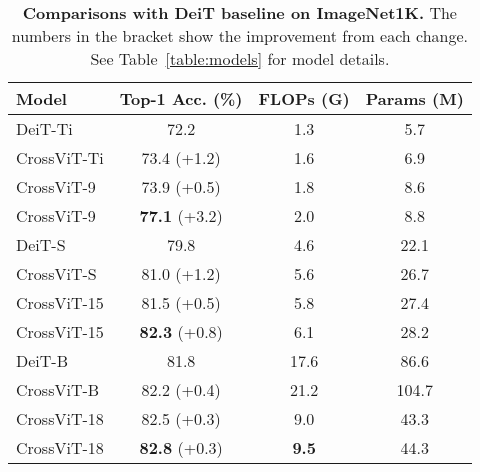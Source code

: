 \documentclass[10pt,twocolumn,letterpaper]{article}
\def\ours{CrossViT\xspace}
\begin{document}
%
 \begin{table}[t]
    \centering
    \begin{adjustbox}{max width=\linewidth}
    \begin{tabular}{l|c|c|c}
        \toprule
             Model   & Top-1 Acc. (\%) & FLOPs (G) & Params (M)  \\ 
        \midrule
             DeiT-Ti  & 72.2 & 1.3 & 5.7 \\
            \ours-Ti & 73.4 (+1.2) & 1.6 & 6.9 \\ 
\ours-9 & 73.9 (+0.5) & 1.8 & 8.6 \\
             \ours-9 & \textbf{77.1} (+3.2) & 2.0 & 8.8 \\






\midrule
            DeiT-S  &  79.8 & 4.6 & 22.1 \\
            \ours-S &  81.0 (+1.2) & 5.6 & 26.7 \\
            \ours-15&  81.5 (+0.5) & 5.8& 27.4 \\
            \ours-15 & \textbf{82.3} (+0.8) & 6.1 & 28.2 \\ 
            \midrule


DeiT-B  &  81.8 & 17.6 & 86.6 \\
            \ours-B &  82.2 (+0.4) & 21.2 & 104.7\\
\ours-18& 82.5 (+0.3) & 9.0 & 43.3 \\ 


\ours-18 & \textbf{82.8} (+0.3) & \textbf{9.5} & 44.3 \\ 
        \bottomrule
    \end{tabular}
    \end{adjustbox}
\caption{\textbf{Comparisons with DeiT baseline on ImageNet1K.} The numbers in the bracket show the improvement from each change. See Table~\ref{table:models} for model details.}
    \label{table:baseline}
\end{table}

%
\end{document}
